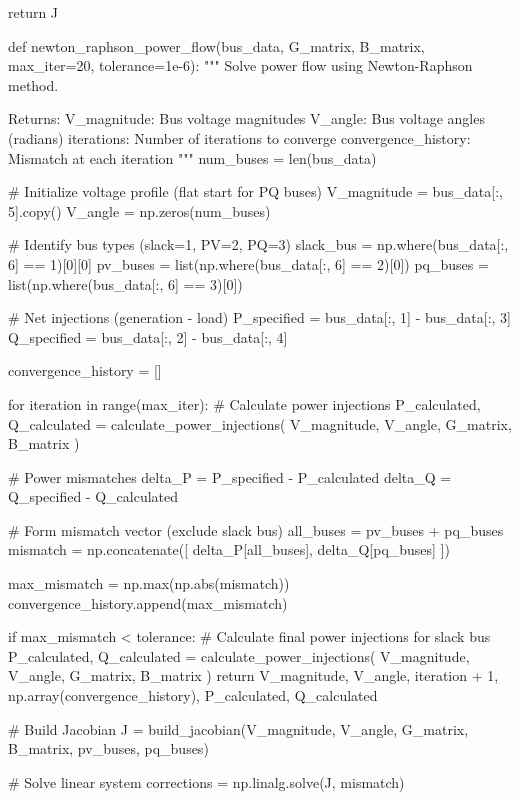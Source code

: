 \documentclass[11pt,a4paper]{article}
\begin{document}
\begin{pycode}
    return J

def newton_raphson_power_flow(bus_data, G_matrix, B_matrix, max_iter=20, tolerance=1e-6):
    """
    Solve power flow using Newton-Raphson method.

    Returns:
        V_magnitude: Bus voltage magnitudes
        V_angle: Bus voltage angles (radians)
        iterations: Number of iterations to converge
        convergence_history: Mismatch at each iteration
    """
    num_buses = len(bus_data)

    # Initialize voltage profile (flat start for PQ buses)
    V_magnitude = bus_data[:, 5].copy()
    V_angle = np.zeros(num_buses)

    # Identify bus types (slack=1, PV=2, PQ=3)
    slack_bus = np.where(bus_data[:, 6] == 1)[0][0]
    pv_buses = list(np.where(bus_data[:, 6] == 2)[0])
    pq_buses = list(np.where(bus_data[:, 6] == 3)[0])

    # Net injections (generation - load)
    P_specified = bus_data[:, 1] - bus_data[:, 3]
    Q_specified = bus_data[:, 2] - bus_data[:, 4]

    convergence_history = []

    for iteration in range(max_iter):
        # Calculate power injections
        P_calculated, Q_calculated = calculate_power_injections(
            V_magnitude, V_angle, G_matrix, B_matrix
        )

        # Power mismatches
        delta_P = P_specified - P_calculated
        delta_Q = Q_specified - Q_calculated

        # Form mismatch vector (exclude slack bus)
        all_buses = pv_buses + pq_buses
        mismatch = np.concatenate([
            delta_P[all_buses],
            delta_Q[pq_buses]
        ])

        max_mismatch = np.max(np.abs(mismatch))
        convergence_history.append(max_mismatch)

        if max_mismatch < tolerance:
            # Calculate final power injections for slack bus
            P_calculated, Q_calculated = calculate_power_injections(
                V_magnitude, V_angle, G_matrix, B_matrix
            )
            return V_magnitude, V_angle, iteration + 1, np.array(convergence_history), P_calculated, Q_calculated

        # Build Jacobian
        J = build_jacobian(V_magnitude, V_angle, G_matrix, B_matrix, pv_buses, pq_buses)

        # Solve linear system
        corrections = np.linalg.solve(J, mismatch)


\end{pycode}
\end{document}
